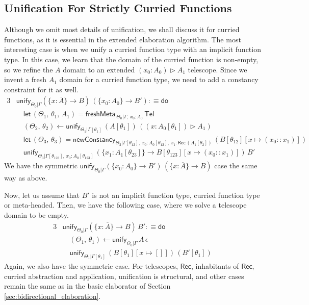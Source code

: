 \documentclass[acmsmall,review,anonymous,prologue,dvipsnames]{acmart}\settopmatter{printfolios=true,printccs=false,printacmref=false}
\newcommand{\slet}{\boldsymbol{\mathsf{let}}}
\newcommand{\freshMeta}[3]{\mathsf{freshMeta}\,_{#1|#2}\,#3}
\newcommand{\newConstancy}[5]{\mathsf{newConstancy}_{#1|#2,\,#3 : \Rec\,#4}\,#5}
\newcommand{\unify}{\mathsf{unify}}
\newcommand{\edo}{\boldsymbol{\mathsf{do}}}
\newcommand{\Tel}{\mathsf{Tel}}
\newcommand{\TCons}{\triangleright}
\newcommand{\Rec}{\mathsf{Rec}}
\newcommand{\ol}[1]{\overline{#1}}
\theoremstyle{remark}
\begin{document}
\subsection{Unification For Strictly Curried Functions}
Although we omit most details of unification, we shall discuss it for curried
functions, as it is essential in the extended elaboration algorithm.  The most
interesting case is when we unify a curried function type with an implicit
function type. In this case, we learn that the domain of the curried function is
non-empty, so we refine the $A$ domain to an extended $(x_0 : A_0) \TCons A_1$
telescope. Since we invent a fresh $A_1$ domain for a curried function type, we
need to add a constancy constraint for it as well.
\begin{alignat*}{3}
& \unify_{\Theta_0|\Gamma}(\{x : \ol{A}\}\to B)\,(\{x_0 : A_0\}\to B') :\equiv \edo\\
& \quad \slet\,(\Theta_1,\,\theta_1,\,A_1) = \freshMeta{\Theta_0}{\Gamma,\,x_0 : A_0}{\Tel}\\
& \quad (\Theta_2,\,\theta_2) \leftarrow
  \unify_{\Theta_1|\Gamma[\theta_1]}\,(A[\theta_1])\,((x : A_0[\theta_1])\TCons A_1)\\
& \quad \slet\,(\Theta_3,\,\theta_3) =
    \newConstancy{\Theta_2}{\Gamma[\theta_{12}],\,x_0 : A_0[\theta_{12}]}{x_1}{(A_1[\theta_2])}{(B[\theta_{12}][x\mapsto (x_0 :: x_1)])}\\
& \quad\unify_{\Theta_3|\Gamma[\theta_{123}],\,x_0 : A_0[\theta_{123}]}\,
         (\{x_1 : A_1[\theta_{23}]\}\to B[\theta_{123}][x\mapsto (x_0 :: x_1)])\,B'
\end{alignat*}
We have the symmetric $\unify_{\Theta_0|\Gamma}(\{x_0 : A_0\}\to B')\,(\{x :
\ol{A}\}\to B)$ case the same way as above.

Now, let us assume that $B'$ is not an implicit function type, curried function
type or meta-headed. Then, we have the following case, where we solve a
telescope domain to be empty.
\begin{alignat*}{3}
& \unify_{\Theta_0|\Gamma}(\{x : \ol{A}\}\to B)\,B' :\equiv \edo\\
& \quad (\Theta_1,\,\theta_1) \leftarrow \unify_{\Theta_0|\Gamma}\,A\,\epsilon\\
& \quad \unify_{\Theta_1|\Gamma[\theta_1]}\,(B[\theta_1][x\mapsto[]])\,(B'[\theta_1])
\end{alignat*}
Again, we also have the symmetric case. For telescopes, $\Rec$, inhabitants of
$\Rec$, curried abstraction and application, unification is structural, and
other cases remain the same as in the basic elaborator of Section
\ref{sec:bidirectional_elaboration}.
\end{document}

